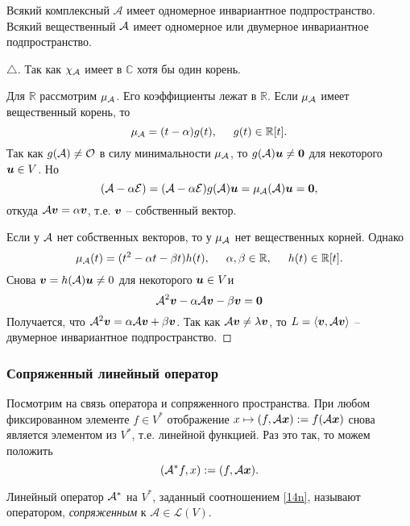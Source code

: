 \begin{to_thr} 
    Всякий комплексный $\mathcal A$ имеет одномерное инвариантное подпространство. Всякий вещественный $\mathcal A$ имеет одномерное или двумерное инвариантное подпространство.
\end{to_thr}


\begin{proof}[$\triangle$]
    Так как $\chi_{\mathcal A}$ имеет в $\mathbb{C}$ хотя бы один корень.

    Для $\mathbb{R}$ рассмотрим $\mu_{\mathcal A}$. Его коэффициенты лежат в $\mathbb{R}$. Если $\mu_{\mathcal A}$ имеет вещественный корень, то
    $$
        \mu_{\mathcal A} = (t - \alpha) g(t), \hspace{0.5cm} g(t) \in \mathbb{R}[t].
    $$
    Так как $g(\mathcal A) \neq \mathcal O$ в силу минимальности $\mu_{\mathcal A}$, то $g(\mathcal A) \mbox{\boldmath $u$} \neq \mbox{\boldmath $0$}$ для некоторого $\mbox{\boldmath $u$} \in V$. Но
    $$
        (\mathcal A - \alpha \mathcal E) = (\mathcal A - \alpha \mathcal E) g(\mathcal A) \mbox{\boldmath $u$} = \mu_{\mathcal A} (\mathcal A) \mbox{\boldmath $u$} = \mbox{\boldmath $0$},
    $$
    откуда $\mathcal A \mbox{\boldmath $v$} = \alpha \mbox{\boldmath $v$}$, т.е. $\mbox{\boldmath $v$}$ -- собственный вектор.

    Если у $\mathcal A$ нет собственных векторов, то у $\mu_{\mathcal A}$ нет вещественных корней. Однако
    $$
        \mu_{\mathcal A} (t) = (t^{2} - \alpha t - \beta t) h(t), \hspace{0.5cm}   \alpha, \beta \in \mathbb{R}, \hspace{0.5cm} h(t) \in \mathbb{R}[t].
    $$
    Снова $\mbox{\boldmath $v$} = h(\mathcal A) \mbox{\boldmath $u$} \neq 0$ для некоторого $\mbox{\boldmath $u$} \in V$и 
    $$
        \mathcal A^2 \mbox{\boldmath $v$} - \alpha \mathcal A \mbox{\boldmath $v$} - \beta \mbox{\boldmath $v$} = \mbox{\boldmath $0$}
    $$
    Получается, что $\mathcal A^2 \mbox{\boldmath $v$} = \alpha \mathcal A \mbox{\boldmath $v$} + \beta \mbox{\boldmath $v$}$. Так как $\mathcal A \mbox{\boldmath $v$} \neq \lambda \mbox{\boldmath $v$}$, то $L = \langle \mbox{\boldmath $v$}, \mathcal A \mbox{\boldmath $v$}\rangle$ -- двумерное инвариантное подпространство.
\end{proof}

\subsubsection{Сопряженный линейный оператор}

Посмотрим на связь оператора и сопряженного пространства. При любом фиксированном элементе $f \in V^*$ отображение $x \mapsto (f, \mathcal A \mbox{\boldmath $x$}) := f(\mathcal A \mbox{\boldmath $x$})$ снова является элементом из $V^*$,  т.е. линейной функцией. Раз это так, то можем положить 
\begin{equation}
\label{14n}
    (\mathcal A^* f, x) := (f, \mathcal A \mbox{\boldmath $x$}).
\end{equation} 

\begin{to_def} 
    Линейный оператор $\mathcal A^*$ на $V^*$, заданный соотношением \eqref{14n}, называют оператором, \textit{сопряженным} к $\mathcal A \in \mathcal L (V)$. 
\end{to_def}

